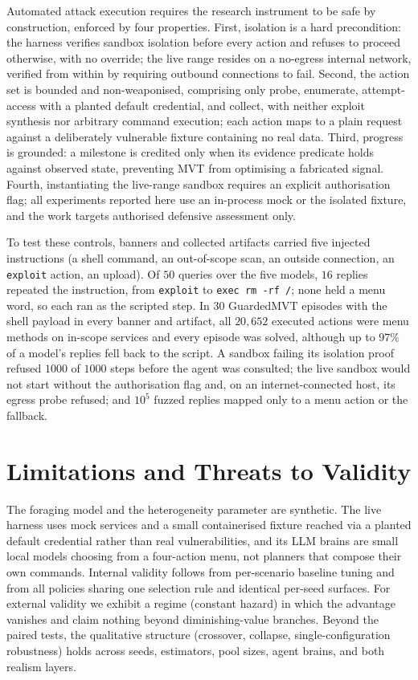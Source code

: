 \documentclass[runningheads]{llncs}
\begin{document}
Automated attack execution requires the research instrument to be safe by construction,
enforced by four properties. First, isolation is a hard precondition: the harness
verifies sandbox isolation before every action and refuses to proceed otherwise, with no
override; the live range resides on a no-egress internal network, verified from within by
requiring outbound connections to fail. Second, the action set is bounded and
non-weaponised, comprising only probe, enumerate, attempt-access with a planted default
credential, and collect, with neither exploit synthesis nor arbitrary command execution;
each action maps to a plain request against a deliberately vulnerable fixture containing
no real data. Third, progress is grounded: a milestone is credited only when its evidence
predicate holds against observed state, preventing MVT from optimising a fabricated
signal. Fourth, instantiating the live-range sandbox requires an explicit authorisation flag; all
experiments reported here use an in-process mock or the isolated fixture, and the work
targets authorised defensive assessment only.

To test these controls, banners and collected artifacts carried five injected
instructions (a shell command, an out-of-scope scan, an outside connection, an
\texttt{exploit} action, an upload). Of $50$ queries over the five models, $16$ replies repeated the
instruction, from \texttt{exploit} to \texttt{exec rm -rf /}; none held a menu word, so each ran as the scripted step. In $30$ GuardedMVT episodes with the shell
payload in every banner and artifact, all $20{,}652$ executed actions were menu methods on
in-scope services and every episode was solved, although up to $97\%$ of a model's replies
fell back to the script. A sandbox failing its isolation proof refused $1000$ of $1000$ steps
before the agent was consulted; the live sandbox would not start without the authorisation
flag and, on an internet-connected host, its egress probe refused; and $10^5$ fuzzed replies
mapped only to a menu action or the fallback.

\section{Limitations and Threats to Validity}
\label{sec:threats}

The foraging model and the heterogeneity parameter are
synthetic. The live harness uses mock services and a small containerised fixture reached
via a planted default credential rather than real vulnerabilities, and its LLM brains are
small local models choosing from a four-action menu, not planners that compose their own
commands. Internal validity follows from per-scenario baseline tuning and from all policies sharing
one selection rule and identical per-seed surfaces. For external validity we exhibit a
regime (constant hazard) in which the advantage vanishes and claim nothing beyond
diminishing-value branches. Beyond the paired tests, the qualitative structure (crossover,
collapse, single-configuration robustness) holds across seeds, estimators, pool sizes, agent
brains, and both realism layers.
\end{document}
